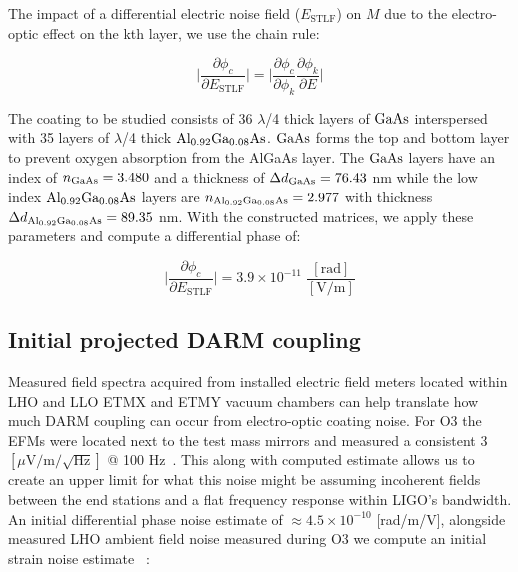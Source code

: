 \noindent The impact of a differential electric noise field ($E_\mathrm{STLF}$) on $M$ due to the electro-optic effect on the kth layer, we use the chain rule:

\begin{equation}
	\bigg| \frac{\partial \phi_c}{\partial  E_\mathrm{STLF}} \bigg| =  \bigg| \frac{\partial \phi_c}{\partial \phi_k}  \frac{\partial \phi_k}{\partial E} \bigg|
\end{equation}

The coating to be studied consists of 36 $\lambda$/4  thick layers of $\mathrm{GaAs}$ interspersed with 35 layers of $\lambda$/4 thick $\mathrm{Al_{0.92}Ga_{0.08}As}$. $\mathrm{GaAs}$ forms the top and bottom layer to prevent oxygen absorption from the AlGaAs layer. The $\mathrm{GaAs}$ layers have an index of $n_{\mathrm{GaAs}} = 3.480$ and a thickness of $\Delta d_{\mathrm{GaAs}} = 76.43$ nm while the low index $\mathrm{Al_{0.92}Ga_{0.08}As}$ layers are $n_{\mathrm{Al_{0.92}Ga_{0.08}As}} = 2.977$ with thickness $\Delta d_{\mathrm{Al_{0.92}Ga_{0.08}As}} = 89.35$ nm. With the constructed matrices, we apply these parameters and compute a differential phase of:

\begin{equation}
    \bigg| \frac{\partial \phi_c}{\partial  E_\mathrm{STLF}} \bigg|  = 3.9 \times 10^{-11}\; \frac{[\mathrm{rad}]}{[\mathrm{V}/\mathrm{m}]}     
\end{equation}



\subsection{Initial projected DARM coupling}
Measured field spectra acquired from installed electric field meters located within LHO and LLO ETMX and ETMY vacuum chambers can help translate how much DARM coupling can occur from electro-optic coating noise. For O3 the EFMs were located next to the test mass mirrors and measured a consistent 3 $[\mu \mathrm{V} / \mathrm{m} / \sqrt{\mathrm{Hz}}]$ @ 100 Hz~\cite{buikema:2020}. This along with computed estimate allows us to create an upper limit for what this noise might be assuming incoherent fields between the end stations and a flat frequency response within LIGO's bandwidth. An initial differential phase noise estimate of $\approx 4.5\times 10^{-10}$ [rad/m/V], alongside measured LHO ambient field noise measured during O3 we compute an initial strain noise estimate ~\cite{fejer_estimate, buikema:2020}:

